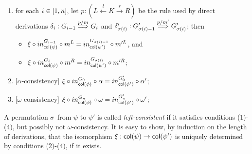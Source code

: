 {\begin{definition}
\begin{enumerate}
\item for each $i \in [{1},{n}]$, let  $p : (L \stackrel{l}{\leftarrow} K \stackrel{r}{\rightarrow} R)$ be the
rule used by direct derivations $\delta_i: G_{i-1} \stackrel{{p/m}}{\Longrightarrow} G_{i}$ and
$\delta'_{\sigma(i)}: G'_{\sigma(i)-1} \stackrel{{p/m'}}{\Longrightarrow} G'_{\sigma(i)}$; then 
\begin{itemize}
\item$\xi \circ in^{G_{i-1}}_{\mathsf{col}({\psi})} \circ m^L =
  in^{G_{\sigma(i)-1}}_{\mathsf{col}({\psi'})} \circ m'^L$, and 
  \item $\xi \circ in^{G_{i}}_{\mathsf{col}({\psi})} \circ m^R =
  in^{G_{\sigma(i)}}_{\mathsf{col}({\psi'})} \circ m'^R$;
\end{itemize}
  
\item {[$\alpha$-consistency]} $\xi \circ in^{G_0}_{\mathsf{col}({\phi})} \circ \alpha = in^{G'_0}_{\mathsf{col}({\phi'})} \circ \alpha'$;

\item {[$\omega$-consistency]}  $\xi \circ in^{G_n}_{\mathsf{col}({\phi})} \circ \omega = in^{G'_n}_{\mathsf{col}({\phi'})} \circ \omega'$;


%

\end{enumerate}
A permutation $\sigma$ from $\psi$ to $\psi'$ is called \emph{left-consistent} if it satisfies 
conditions (1)-(4), but possibly not $\omega$-consistency.
It is easy to show, by induction on the length of derivations, that the isomorphism 
$\xi: \mathsf{col}({\psi}) \to \mathsf{col}({\psi'})$ is uniquely determined by conditions (2)-(4), if it exists. 


\end{definition}}

